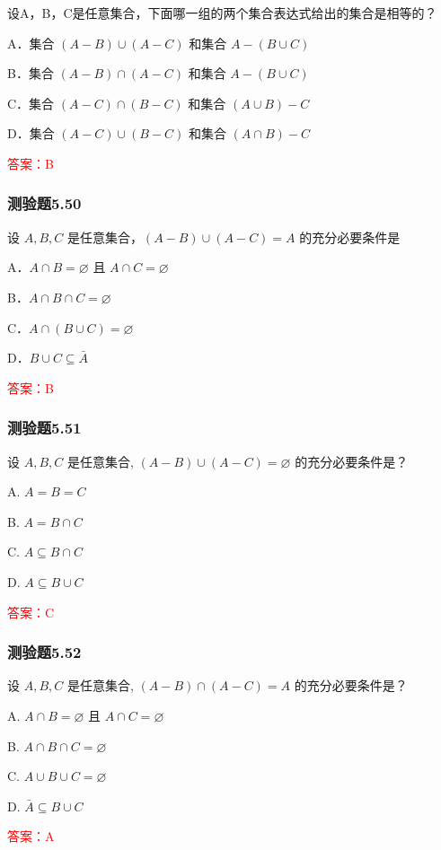 \documentclass[UTF8, heading=true]{ctexart}
\begin{document}
设A，B，C是任意集合，下面哪一组的两个集合表达式给出的集合是相等的？

A．集合 $(A-B) \cup(A-C)$ 和集合 $A-(B \cup C)$

B．集合 $(A-B) \cap(A-C)$ 和集合 $A-(B \cup C)$

C．集合 $(A-C) \cap(B-C)$ 和集合 $(A \cup B)-C$

D．集合 $(A-C) \cup(B-C)$ 和集合 $(A \cap B)-C$

\textcolor{red}{答案：B}

\subsubsection{测验题5.50}

设 $A, B, C$ 是任意集合，$(A-B) \cup(A-C)=A$ 的充分必要条件是

A．$A \cap B=\varnothing$ 且 $A \cap C=\varnothing$

B．$A \cap B \cap C=\varnothing$

C．$A \cap(B \cup C)=\varnothing$

D．$B \cup C \subseteq \bar{A}$

\textcolor{red}{答案：B}

\subsubsection{测验题5.51}

设 $A, B, C$ 是任意集合, $(A-B) \cup(A-C)=\varnothing$ 的充分必要条件是？

A. $A=B=C$

B. $A=B \cap C$

C. $A \subseteq B \cap C$

D. $A \subseteq B \cup C$

\textcolor{red}{答案：C}

\subsubsection{测验题5.52}

设 $A, B, C$ 是任意集合, $(A-B) \cap(A-C)=A$ 的充分必要条件是？

A. $A \cap B=\varnothing$ 且 $A \cap C=\varnothing$

B. $A \cap B \cap C=\varnothing$

C. $A \cup B \cup C=\varnothing$

D. $\bar{A} \subseteq B \cup C$

\textcolor{red}{答案：A}
\end{document}
